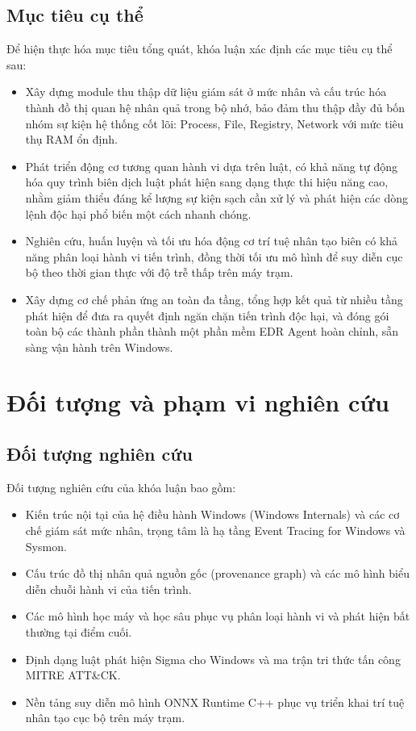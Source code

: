 \subsection{Mục tiêu cụ thể}

Để hiện thực hóa mục tiêu tổng quát, khóa luận xác định các mục tiêu cụ thể sau:

\begin{itemize}
    \item Xây dựng module thu thập dữ liệu giám sát ở mức nhân và cấu trúc hóa thành đồ thị quan hệ nhân quả trong bộ nhớ, bảo đảm thu thập đầy đủ bốn nhóm sự kiện hệ thống cốt lõi: Process, File, Registry, Network với mức tiêu thụ RAM ổn định.
    \item Phát triển động cơ tương quan hành vi dựa trên luật, có khả năng tự động hóa quy trình biên dịch luật phát hiện sang dạng thực thi hiệu năng cao, nhằm giảm thiểu đáng kể lượng sự kiện sạch cần xử lý và phát hiện các dòng lệnh độc hại phổ biến một cách nhanh chóng.
    \item Nghiên cứu, huấn luyện và tối ưu hóa động cơ trí tuệ nhân tạo biên có khả năng phân loại hành vi tiến trình, đồng thời tối ưu mô hình để suy diễn cục bộ theo thời gian thực với độ trễ thấp trên máy trạm.
    \item Xây dựng cơ chế phản ứng an toàn đa tầng, tổng hợp kết quả từ nhiều tầng phát hiện để đưa ra quyết định ngăn chặn tiến trình độc hại, và đóng gói toàn bộ các thành phần thành một phần mềm EDR Agent hoàn chỉnh, sẵn sàng vận hành trên Windows.
\end{itemize}

\section{Đối tượng và phạm vi nghiên cứu}

\subsection{Đối tượng nghiên cứu}

Đối tượng nghiên cứu của khóa luận bao gồm:

\begin{itemize}
    \item Kiến trúc nội tại của hệ điều hành Windows (Windows Internals) và các cơ chế giám sát mức nhân, trọng tâm là hạ tầng Event Tracing for Windows và Sysmon.
    \item Cấu trúc đồ thị nhân quả nguồn gốc (provenance graph) và các mô hình biểu diễn chuỗi hành vi của tiến trình.
    \item Các mô hình học máy và học sâu phục vụ phân loại hành vi và phát hiện bất thường tại điểm cuối.
    \item Định dạng luật phát hiện Sigma cho Windows và ma trận tri thức tấn công MITRE ATT\&CK.
    \item Nền tảng suy diễn mô hình ONNX Runtime C++ phục vụ triển khai trí tuệ nhân tạo cục bộ trên máy trạm.
\end{itemize}

